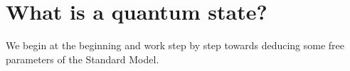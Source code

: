 \section{What is a quantum state?}
\label{sec:what_is_a_quantum_state}
We begin at the beginning and work step by step towards deducing some free parameters of the
Standard Model.
